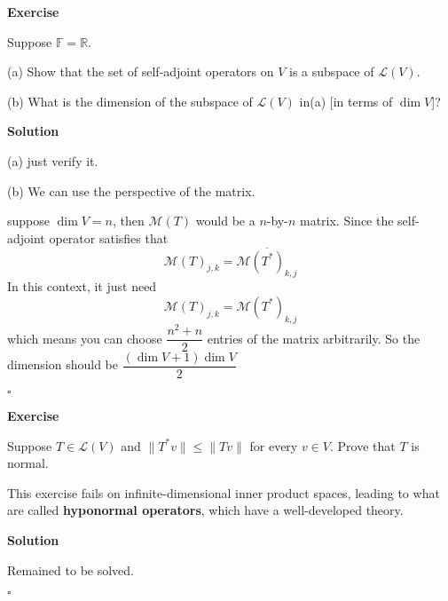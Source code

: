 \documentclass{article}
\newenvironment{exercise}{%
{\textbf{Exercise\\}
    }
}{
}
\newenvironment{solution}{%
{
    \textbf{Solution\\}
    }
}{
  \hfill $\square$ 
  \par\bigskip 
}
\newcommand{\RR}{\mathbb{R}}
\newcommand{\FF}{\mathbb{F}}
\begin{document}
\begin{CJK}{UTF8}{gkai}
\begin{exercise}
    Suppose $\FF = \RR$.

    (a) Show that the set of self-adjoint operators on $V$ is a subspace of $\mathcal{L}(V)$.

    (b) What is the dimension of the subspace of $\mathcal{L}(V)$ in(a) [in terms of $\dim V$]?
\end{exercise}

\begin{solution}
    (a) just verify it.

    (b) We can use the perspective of the matrix.

    suppose $\dim V= n$, then $\mathcal{M}(T)$ would be a $n$-by-$n$ matrix. Since the self-adjoint operator satisfies that 
    \[\mathcal{M}(T)_{j,k} = \overline{\mathcal{M}(T^\ast)_{k,j}}\]
    In this context, it just need 
    \[\mathcal{M}(T)_{j,k} = \mathcal{M}(T^\ast)_{k,j}\]
    which means you can choose $\dfrac{n^2 + n}{2}$ entries of the matrix arbitrarily. So the dimension should be $\dfrac{(\dim V + 1)\dim V}{2}$
\end{solution}

\begin{exercise}
    Suppose $T \in \mathcal{L}(V)$ and $\|T^\ast v\| \leq \|Tv\|$ for every $v \in  V$. Prove that $T$ is normal.

    This exercise fails on infinite-dimensional inner product spaces, leading to what are called \textbf{hyponormal operators}, which have a well-developed theory.
\end{exercise}

\begin{solution}
    Remained to be solved.
\end{solution}


\end{CJK}
\end{document}
